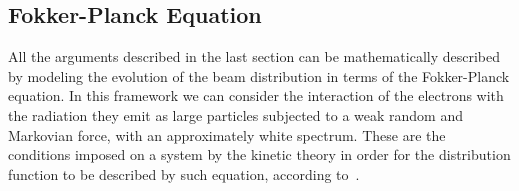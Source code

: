 \subsection{Fokker-Planck Equation}\label{ssec:fokker_planck_equation}

	All the arguments described in the last section can be mathematically described by modeling the evolution of the beam distribution in terms of the Fokker-Planck equation. In this framework we can consider the interaction of the electrons with the radiation they emit as large particles subjected to a weak random and Markovian force, with an approximately white spectrum. These are the conditions imposed on a system by the kinetic theory in order for the distribution function to be described by such equation, according to~.


